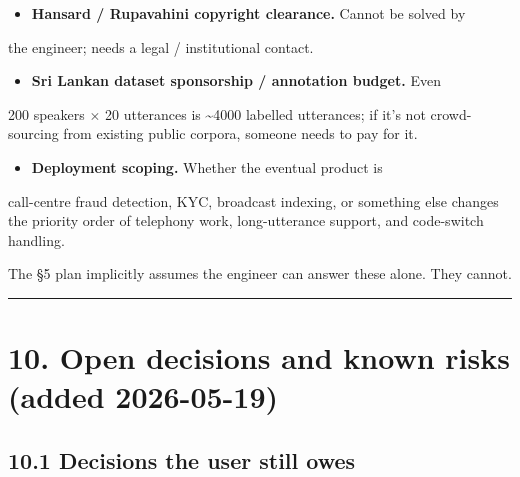 \documentclass[10pt,a4paper]{article}
\begin{document}
\begin{itemize}[leftmargin=*,itemsep=2pt]
  \item \textbf{Hansard / Rupavahini copyright clearance.} Cannot be solved by
\end{itemize}
the engineer; needs a legal / institutional contact.
\begin{itemize}[leftmargin=*,itemsep=2pt]
  \item \textbf{Sri Lankan dataset sponsorship / annotation budget.} Even
\end{itemize}
200 speakers $\times$ 20 utterances is \textasciitilde{}4000 labelled utterances; if it's not crowd-sourcing from existing public corpora, someone needs to pay for it.
\begin{itemize}[leftmargin=*,itemsep=2pt]
  \item \textbf{Deployment scoping.} Whether the eventual product is
\end{itemize}
call-centre fraud detection, KYC, broadcast indexing, or something else changes the priority order of telephony work, long-utterance support, and code-switch handling.

The §5 plan implicitly assumes the engineer can answer these alone. They cannot.

\vspace{0.5em}\hrule\vspace{0.5em}

\section*{10. Open decisions and known risks (added 2026-05-19)}

\subsection*{10.1 Decisions the user still owes}
\end{document}
